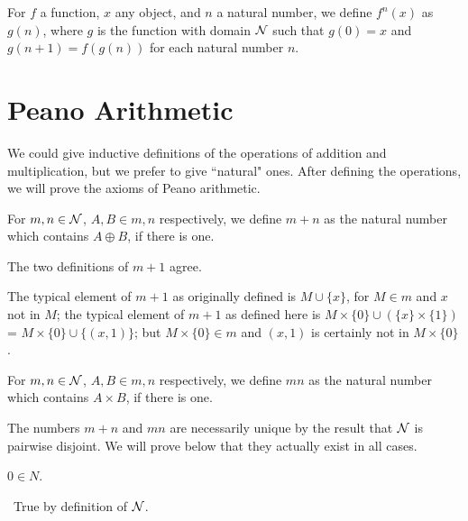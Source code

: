 \begin{definition}
 For $f$ a function, $x$ any object, and $n$ a natural number, we define
 $f^n(x)$ as $g(n)$, where $g$ is the function with domain $\cal N$ such that
 $g(0) = x$ and $g(n+1) = f(g(n))$ for each natural 
 number $n$.
\end{definition}




\section{Peano Arithmetic}

We could give inductive definitions of the operations of
addition and multiplication, but we prefer to give ``natural" ones.
After defining the operations, we will prove the axioms of Peano
arithmetic.

\begin{definition}
 For $m,n \in {\cal N}$, $A,B \in m,n$ respectively, we define $m + n$ as
 the natural number
 which contains $A \oplus B$, if there is one.
\end{definition}

\begin{thm}
 The two definitions of $m+1$ agree.
\end{thm}

\preuve The typical element of $m+1$ as originally defined is $M \cup \{x\}$,
for $M \in m$ and $x$ not in $M$; the typical element of $m+1$ as defined here
is $M \times \{0\} \cup (\{x\} \times \{1\})$ = $M \times \{0\} \cup
\{(x,1)\}$; but $M \times \{0\} \in m$ and $(x,1)$ is certainly not in $M
\times \{0\}$.
\finpreuve

\begin{definition}
 For $m,n \in {\cal N}$, $A,B \in m,n$ respectively, we define
 $mn$ as
 the natural number which contains $A \times B$, if there is one.
\end{definition}

The numbers $m+n$ and $mn$ are necessarily unique by the result that
${\cal N}$
is pairwise disjoint.  We will prove below that they actually
exist in all cases.

\begin{thm}
 $0 \in N$.
\end{thm}

\preuve\ True by definition of ${\cal N}$.
\finpreuve

